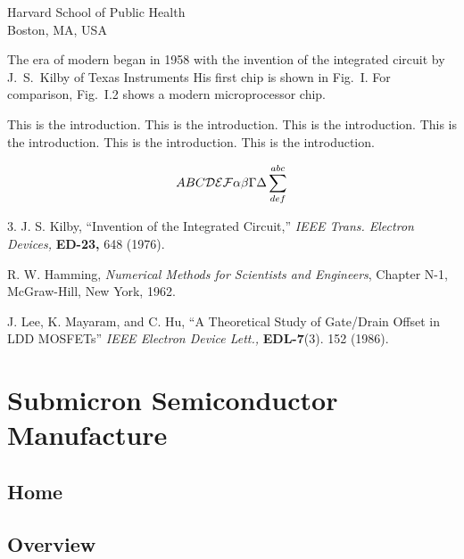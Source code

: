\documentclass{wileySix}
\begin{document}
\begin{introduction}


{Harvard School of Public Health\\
Boston, MA, USA}

The era of modern  
began in 1958 with the invention of the
integrated circuit by J.~S.~Kilby
 of Texas Instruments
His first chip is shown in Fig.~I. For comparison,
Fig.~I.2 shows a modern microprocessor chip.


This is the introduction.
This is the introduction.
This is the introduction.
This is the introduction.
This is the introduction.
This is the introduction.

\begin{equation}
ABC {\cal DEF} \alpha\beta\Gamma\Delta\sum^{abc}_{def}
\end{equation}


\begin{chapreferences}{3.}
J. S. Kilby,
``Invention of the Integrated Circuit,'' {\it IEEE Trans. Electron Devices,}
{\bf ED-23,} 648 (1976).

R. W. Hamming,
                 {\it Numerical Methods for Scientists and 
                 Engineers}, Chapter N-1, McGraw-Hill, 
                 New York, 1962.

J. Lee, K. Mayaram, and C. Hu, ``A Theoretical
               Study of Gate/Drain Offset in LDD MOSFETs''
                     {\it IEEE Electron Device Lett.,} {\bf EDL-7}(3). 152 
                     (1986).
\end{chapreferences}
\end{introduction}


\part[Submicron Semiconductor Manufacture]
{Submicron Semiconductor\\ Manufacture}

\chapter{Home}

%

\chapter{Overview}

%
\end{document}
